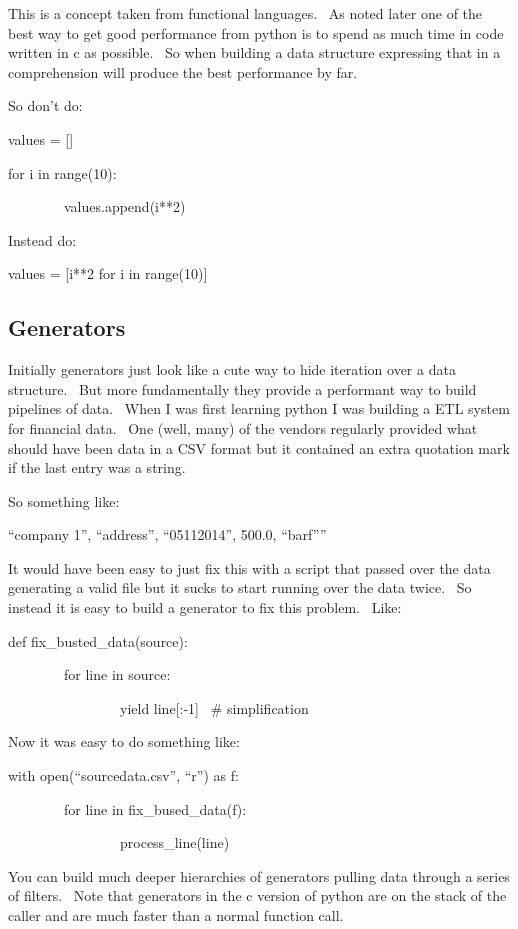 \documentclass[]{article}
\begin{document}
This is a concept taken from functional languages. ~As noted later one
of the best way to get good performance from python is to spend as much
time in code written in c as possible. ~So when building a data
structure expressing that in a comprehension will produce the best
performance by far.

So don't do:

values = {[}{]}

for i in range(10):

~~~~~~~~values.append(i**2)

Instead do:

values = {[}i**2 for i in range(10){]}

\subsection{Generators}

Initially generators just look like a cute way to hide iteration over a
data structure. ~But more fundamentally they provide a performant way to
build pipelines of data. ~When I was first learning python I was
building a ETL system for financial data. ~One (well, many) of the
vendors regularly provided what should have been data in a CSV format
but it contained an extra quotation mark if the last entry was a string.

So something like:

``company 1'', ``address'', ``05112014'', 500.0, ``barf''''

It would have been easy to just fix this with a script that passed over
the data generating a valid file but it sucks to start running over the
data twice. ~So instead it is easy to build a generator to fix this
problem. ~Like:

def fix\_busted\_data(source):

~~~~~~~~for line in source:

~~~~~~~~~~~~~~~~yield line{[}:-1{]} ~\# simplification

Now it was easy to do something like:

with open(``sourcedata.csv'', ``r'') as f:

~~~~~~~~for line in fix\_bused\_data(f):

~~~~~~~~~~~~~~~~process\_line(line)

You can build much deeper hierarchies of generators pulling data through
a series of filters. ~Note that generators in the c version of python
are on the stack of the caller and are much faster than a normal
function call.
\end{document}
